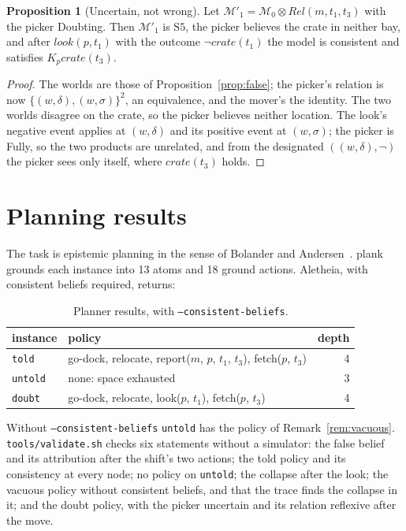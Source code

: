 \documentclass[11pt,a4paper]{article}
\theoremstyle{definition}
\newtheorem{proposition}{Proposition}
\newcommand{\Mod}{\mathcal{M}}
\newcommand{\prd}{\otimes}
\newcommand{\Kop}[1]{K_{#1}}
\newcommand{\code}[1]{\texttt{\small #1}}
\newcommand{\ag}[1]{\mathit{#1}}
\newcommand{\pk}{\ag{p}}
\newcommand{\mv}{\ag{m}}
\newcommand{\crate}{\mathit{crate}}
\begin{document}
\begin{proposition}[Uncertain, not wrong]
\label{prop:doubt}
Let $\Mod'_1 = \Mod_0 \prd \mathit{Rel}(\mv, t_1, t_3)$ with the picker Doubting.
Then $\Mod'_1$ is $\mathrm{S5}$, the picker believes the crate in neither bay,
and after $\mathit{look}(\pk, t_1)$ with the outcome $\neg\crate(t_1)$ the model
is consistent and satisfies $\Kop{\pk}\crate(t_3)$.
\end{proposition}

\begin{proof}
The worlds are those of Proposition~\ref{prop:false}; the picker's relation is
now $\{(w,\delta),(w,\sigma)\}^2$, an equivalence, and the mover's the
identity. The two worlds disagree on the crate, so the picker believes neither
location. The look's negative event applies at $(w,\delta)$ and its positive
event at $(w,\sigma)$; the picker is Fully, so the two products are unrelated,
and from the designated $((w,\delta),\neg)$ the picker sees only itself, where
$\crate(t_3)$ holds.
\end{proof}

\section{Planning results}
\label{sec:planning}

The task is epistemic planning in the sense of Bolander and
Andersen~\cite{bolander2011}. plank grounds each instance into 13 atoms and 18
ground actions. Aletheia, with consistent beliefs required, returns:

\begin{table}[H]
\centering\small
\caption{Planner results, with \code{--consistent-beliefs}.}
\label{tab:planning}
\begin{tabularx}{\textwidth}{@{}l X r@{}}
\toprule
instance & policy & depth \\
\midrule
\code{told} & go-dock, relocate, report($\mv$, $\pk$, $t_1$, $t_3$), fetch($\pk$, $t_3$) & 4 \\
\code{untold} & none: space exhausted & 3 \\
\code{doubt} & go-dock, relocate, look($\pk$, $t_1$), fetch($\pk$, $t_3$) & 4 \\
\bottomrule
\end{tabularx}
\end{table}

\noindent
Without \code{--consistent-beliefs} \code{untold} has the policy of
Remark~\ref{rem:vacuous}. \code{tools/validate.sh} checks six statements
without a simulator: the false belief and its attribution after the shift's two
actions; the told policy and its consistency at every node; no policy on
\code{untold}; the collapse after the look; the vacuous policy without
consistent beliefs, and that the trace finds the collapse in it; and the doubt
policy, with the picker uncertain and its relation reflexive after the move.
\end{document}
